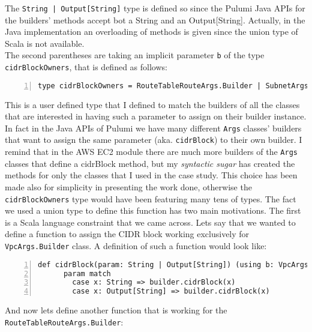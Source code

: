 The \texttt{String | Output[String]} type is defined so since the Pulumi Java APIs for the builders' methods accept bot a String and an Output[String].
Actually, in the Java implementation an overloading of methods is given since the union type of Scala is not available.\\
The second parentheses are taking an implicit parameter \texttt{b} of the type \texttt{cidrBlockOwners}, that is defined as follows:\\
\begin{minipage}{\linewidth}
\begin{lstlisting}[numbers=left, numberstyle=\tiny, numbersep=-5pt, stepnumber=1, linewidth=420pt]
  type cidrBlockOwners = RouteTableRouteArgs.Builder | SubnetArgs.Builder | VpcArgs.Builder
\end{lstlisting}
\end{minipage}
This is a user defined type that I defined to match the builders of all the  classes that are interested in having such a parameter to assign on their builder instance.
In fact in the Java APIs of Pulumi we have many different \texttt{Args} classes' builders that want to assign the same parameter (aka. \texttt{cidrBlock}) to their own builder.
I remind that in the AWS EC2 module there are much more builders of the \texttt{Args} classes that define a cidrBlock method, but my \textit{syntactic sugar} has created the methods for only the classes that I used in the case study.
This choice has been made also for simplicity in presenting the work done, otherwise the \texttt{cidrBlockOwners} type would have been featuring many tens of types.
The fact we used a union type to define this function has two main motivations.
The first is a Scala language constraint that we came across.
Lets say that we wanted to define a function to assign the CIDR block working exclusively for \texttt{VpcArgs.Builder} class.
A definition of such a function would look like:\\
\begin{minipage}{\linewidth}
\begin{lstlisting}[numbers=left, numberstyle=\tiny, numbersep=-5pt, stepnumber=1, linewidth=420pt]
  def cidrBlock(param: String | Output[String]) (using b: VpcArgs.Builder): Unit =
      param match
        case x: String => builder.cidrBlock(x)
        case x: Output[String] => builder.cidrBlock(x)
\end{lstlisting}
\end{minipage}
And now lets define another function that is working for the \texttt{RouteTableRouteArgs.Builder}:\\
